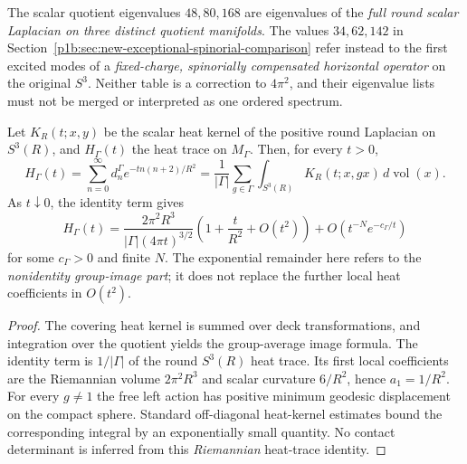 \documentclass[11pt]{article}
\begin{document}
\begin{remark}
\label{p1b:rem:v12-spectrum-owner-distinction}
The scalar quotient eigenvalues $48,80,168$ are eigenvalues of the
\emph{full round scalar Laplacian on three distinct quotient
manifolds}.  The values $34,62,142$ in
Section~\ref{p1b:sec:new-exceptional-spinorial-comparison}
refer instead to the first excited modes of a \emph{fixed-charge,
spinorially compensated horizontal operator} on the original $S^3$.
Neither table is a correction to $4\pi^2$, and their eigenvalue
lists must not be merged or interpreted as one ordered spectrum.
\end{remark}

\begin{theorem}
\label{p1b:thm:v12-quotient-heat-trace}
Let $K_R(t;x,y)$ be the scalar heat kernel of the positive round
Laplacian on $S^3(R)$, and $H_\Gamma(t)$ the heat trace on
$M_\Gamma$.  Then, for every $t>0$,
\[
 H_\Gamma(t)
 =\sum_{n=0}^\infty d_n^\Gamma
    e^{-t n(n+2)/R^2}
 =\frac1{|\Gamma|}\sum_{g\in\Gamma}
   \int_{S^3(R)}K_R(t;x,gx)\,d\operatorname{vol}(x).
\]
As $t\downarrow0$, the identity term gives
\[
 H_\Gamma(t)=\frac{2\pi^2R^3}{|\Gamma|(4\pi t)^{3/2}}
 \left(1+\frac{t}{R^2}+O(t^2)\right)
 +O(t^{-N}e^{-c_\Gamma/t})
\]
for some $c_\Gamma>0$ and finite $N$.  The exponential remainder
here refers to the \emph{nonidentity group-image part}; it does not
replace the further local heat coefficients in $O(t^2)$.
\end{theorem}
\begin{proof}
The covering heat kernel is summed over deck transformations, and
integration over the quotient yields the group-average image formula.
The identity term is $1/|\Gamma|$ of the round $S^3(R)$ heat trace.
Its first local coefficients are the Riemannian volume
$2\pi^2R^3$ and scalar curvature $6/R^2$, hence $a_1=1/R^2$.
For every $g\ne1$ the free left action has positive minimum
geodesic displacement on the compact sphere.  Standard off-diagonal
heat-kernel estimates bound the corresponding integral by an
exponentially small quantity.  No contact determinant is inferred
from this \emph{Riemannian} heat-trace identity.
\end{proof}
\end{document}
